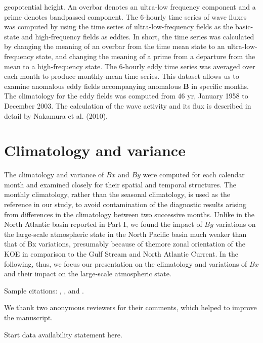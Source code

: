 \documentclass[twocol]{ametsocV5}
\begin{document}
geopotential height. An overbar denotes an ultra-low frequency
component and a prime denotes bandpassed
component. The 6-hourly time series of wave fluxes was
computed by using the time series of ultra-low-frequency
fields as the basic-state and high-frequency fields as eddies.
In short, the time series was calculated by changing the
meaning of an overbar from the time mean state to an
ultra-low-frequency state, and changing the meaning of a
prime from a departure from the mean to a high-frequency
state. The 6-hourly eddy time series was averaged over each
month to produce monthly-mean time series. This dataset
allows us to examine anomalous eddy fields accompanying
anomalous $\mathbf B$ in specific months. The climatology for
the eddy fields was computed from 46 yr, January 1958 to
December 2003. The calculation of the wave activity and
its flux is described in detail by Nakamura et al. (2010).


\section{Climatology and variance}
The climatology and variance of $Bx$ and $By$ were computed
for each calendar month and examined closely for
their spatial and temporal structures. The monthly climatology,
rather than the seasonal climatology, is used as the
reference in our study, to avoid contamination of the diagnostic
results arising from differences in the climatology
between two successive months. Unlike in the North Atlantic
basin reported in Part I, we found the impact of $By$
variations on the large-scale atmospheric state in the
North Pacific basin much weaker than that of Bx variations,
presumably because of themore zonal orientation of
the KOE in comparison to the Gulf Stream and North
Atlantic Current. In the following, thus, we focus our
presentation on the climatology and variations of $Bx$ and
their impact on the large-scale atmospheric state.

Sample citations: \citet{Becker+Schmitz2003}, \citet{Knutti2008},
and \citep{MeixnerEA2002,Kuji_Nakajima2002,EmeryEA1986}.

\acknowledgments
We thank two anonymous reviewers for their comments, which helped
to improve the manuscript.

\datastatement
Start data availability statement here.
\end{document}
